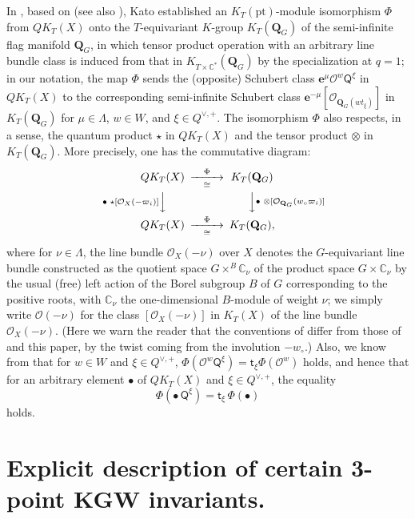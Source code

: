 \documentclass[11pt,a4paper,reqno,dvipdfmx]{amsart}
\numberwithin{equation}{section}
\newcommand{\BC}{\mathbb{C}}
\newcommand{\CO}{\mathcal{O}}
\newcommand{\sQ}{\mathsf{Q}}
\newcommand{\st}{\mathsf{t}}
\newcommand{\be}{\mathbf{e}}
\newcommand{\pt}{\mathrm{pt}}
\newcommand{\lng}{w_{\circ}}
\newcommand{\QG}{\mathbf{Q}_{G}}
\newcommand{\SQG}[1]{[\CO_{\QG(#1)}]}
\theoremstyle{plain}
\theoremstyle{definition}
\theoremstyle{remark}
\begin{document}
In \cite{Kat2}, based on \cite{BF,IMT} (see also \cite{ACT}), 
Kato established an $K_{T}(\pt)$-module isomorphism $\Phi$ from $QK_{T}(X)$ onto 
the $T$-equivariant $K$-group $K_{T}(\QG)$ of the semi-infinite flag manifold $\QG$, 
in which tensor product operation with an arbitrary line bundle class is 
induced from that in $K_{T \times\BC^*}(\QG)$ by the specialization at $q = 1$; 
in our notation, 
the map $\Phi$ sends 
the (opposite) Schubert class $\be^{\mu}\CO^{w} \sQ^{\xi}$ in $QK_{T}(X)$ 
to the corresponding semi-infinite Schubert class $\be^{-\mu}\SQG{ wt_{\xi} }$ 
in $K_{T}(\QG)$ for $\mu \in \Lambda$, $w \in W$, and $\xi \in Q^{\vee,+}$. 
The isomorphism $\Phi$ also respects, in a sense, the quantum product $\star$ 
in $QK_{T}(X)$ and the tensor product $\otimes$ in $K_{T}(\QG)$.
More precisely, one has the commutative diagram:
%
\begin{equation} \label{eq:qdiagram}
%
\begin{CD}
QK_{T}(X) @>{\Phi}>{\cong}> K_{T}(\QG) \\
@V{\bullet \,\, \star [\CO_{X}(- \varpi_i)]}VV  
@VV{\bullet \,\, \otimes [\CO_{\QG}(\lng \varpi_i)]}V \\
QK_{T}(X) @>{\Phi}>{\cong}> K_{T}(\QG), 
\end{CD}
%
\end{equation}
%
where for $\nu \in \Lambda$, the line bundle $\CO_{X}(-\nu)$ over $X$ denotes 
the $G$-equivariant line bundle constructed as 
the quotient space $G \times^{B} \BC_{\nu}$ of 
the product space $G \times \BC_{\nu}$ by the usual (free) left action of 
the Borel subgroup $B$ of $G$ corresponding to the positive roots, 
with $\BC_{\nu}$ the one-dimensional $B$-module of weight $\nu$; 
we simply write $\CO(- \nu)$ for the class $[\CO_{X}(- \nu)]$ in $K_{T}(X)$ of the line bundle $\CO_{X}(- \nu)$. 
(Here we warn the reader that the conventions of \cite{Kat2} 
differ from those of \cite{KaNS} and this paper,
by the twist coming from the involution $-\lng$.)
Also, we know from \cite{Kat2} that for $w \in W$ and $\xi \in Q^{\vee,+}$, 
$\Phi(\CO^{w} \sQ^{\xi} ) = \st_{\xi} \Phi( \CO^{w} )$ holds, 
and hence that for an arbitrary element $\bullet$ of 
$QK_{T}(X)$ and $\xi \in Q^{\vee,+}$, the equality 
%
\begin{equation} \label{eq:push}
\Phi(\bullet \, \sQ^{\xi}) = \st_{\xi} \, \Phi(\bullet)
\end{equation}
%
holds. 

%
\section{Explicit description of certain 3-point KGW invariants.}
\label{sec:main}
\end{document}

